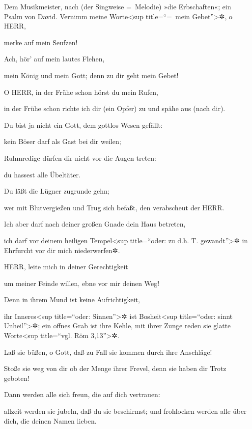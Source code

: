 Dem Musikmeister, nach (der Singweise =~Melodie) »die
Erbschaften«; ein Psalm von David. Vernimm meine
Worte\textless sup title=``=~mein Gebet''\textgreater✲, o HERR,

merke auf mein Seufzen!

Ach, hör' auf mein lautes Flehen,

mein König und mein Gott; denn zu dir geht mein Gebet!

O HERR, in der Frühe schon hörst du mein Rufen,

in der Frühe schon richte ich dir (ein Opfer) zu und spähe aus (nach
dir).

Du bist ja nicht ein Gott, dem gottlos Wesen gefällt:

kein Böser darf als Gast bei dir weilen;

Ruhmredige dürfen dir nicht vor die Augen treten:

du hassest alle Übeltäter.

Du läßt die Lügner zugrunde gehn;

wer mit Blutvergießen und Trug sich befaßt, den verabscheut der HERR.

Ich aber darf nach deiner großen Gnade dein Haus betreten,

ich darf vor deinem heiligen Tempel\textless sup title=``oder: zu d.h.
T. gewandt''\textgreater✲ in Ehrfurcht vor dir mich niederwerfen✲.

HERR, leite mich in deiner Gerechtigkeit

um meiner Feinde willen, ebne vor mir deinen Weg!

Denn in ihrem Mund ist keine Aufrichtigkeit,

ihr Inneres\textless sup title=``oder: Sinnen''\textgreater✲ ist
Bosheit\textless sup title=``oder: sinnt Unheil''\textgreater✲; ein
offnes Grab ist ihre Kehle, mit ihrer Zunge reden sie glatte
Worte\textless sup title=``vgl. Röm 3,13''\textgreater✲.

Laß sie büßen, o Gott, daß zu Fall sie kommen durch ihre
Anschläge!

Stoße sie weg von dir ob der Menge ihrer Frevel, denn sie haben dir
Trotz geboten!

Dann werden alle sich freun, die auf dich vertrauen:

allzeit werden sie jubeln, daß du sie beschirmst; und frohlocken werden
alle über dich, die deinen Namen lieben.

